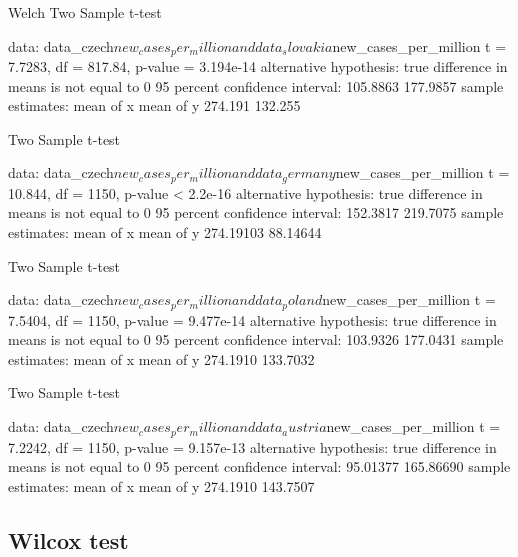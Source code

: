 \documentclass[a4paper, 12pt]{article}
\begin{document}
\begin{Schunk}
\begin{Soutput}
	Welch Two Sample t-test

data:  data_czech$new_cases_per_million and data_slovakia$new_cases_per_million
t = 7.7283, df = 817.84, p-value = 3.194e-14
alternative hypothesis: true difference in means is not equal to 0
95 percent confidence interval:
 105.8863 177.9857
sample estimates:
mean of x mean of y 
  274.191   132.255 
\end{Soutput}
\end{Schunk}

\begin{Schunk}
\begin{Soutput}
	Two Sample t-test

data:  data_czech$new_cases_per_million and data_germany$new_cases_per_million
t = 10.844, df = 1150, p-value < 2.2e-16
alternative hypothesis: true difference in means is not equal to 0
95 percent confidence interval:
 152.3817 219.7075
sample estimates:
mean of x mean of y 
274.19103  88.14644 
\end{Soutput}
\end{Schunk}

\clearpage

\begin{Schunk}
\begin{Soutput}
	Two Sample t-test

data:  data_czech$new_cases_per_million and data_poland$new_cases_per_million
t = 7.5404, df = 1150, p-value = 9.477e-14
alternative hypothesis: true difference in means is not equal to 0
95 percent confidence interval:
 103.9326 177.0431
sample estimates:
mean of x mean of y 
 274.1910  133.7032 
\end{Soutput}
\end{Schunk}

\begin{Schunk}
\begin{Soutput}
	Two Sample t-test

data:  data_czech$new_cases_per_million and data_austria$new_cases_per_million
t = 7.2242, df = 1150, p-value = 9.157e-13
alternative hypothesis: true difference in means is not equal to 0
95 percent confidence interval:
  95.01377 165.86690
sample estimates:
mean of x mean of y 
 274.1910  143.7507 
\end{Soutput}
\end{Schunk}

\subsection{Wilcox test}
\end{document}
